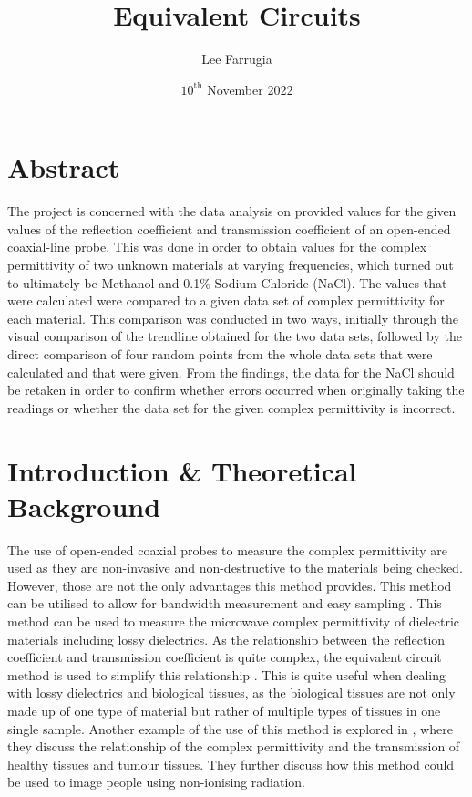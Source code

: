\documentclass[12pt, a4paper]{article}
\title{Equivalent Circuits}
\date{\(10^\mathrm{{th}}\) November 2022}
\author{Lee Farrugia}
\begin{document}
    
\maketitle
\thispagestyle{titlepagestyle}
\pagestyle{mystyle}

\section{Abstract}
The project is concerned with the data analysis on provided values for the given values of the reflection coefficient and transmission coefficient of an open-ended coaxial-line probe. This was done in order to obtain values for the complex permittivity of two unknown materials at varying frequencies, which turned out to ultimately be Methanol and 0.1\% Sodium Chloride (NaCl). The values that were calculated were compared to a given data set of complex permittivity for each material. This comparison was conducted in two ways, initially through the visual comparison of the trendline obtained for the two data sets, followed by the direct comparison of four random points from the whole data sets that were calculated and that were given. From the findings, the data for the NaCl should be retaken in order to confirm whether errors occurred when originally taking the readings or whether the data set for the given complex permittivity is incorrect.

\section{Introduction \& Theoretical Background}
The use of open-ended coaxial probes to measure the complex permittivity are used as they are non-invasive and non-destructive to the materials being checked. However, those are not the only advantages this method provides. This method can be utilised to allow for bandwidth measurement and easy sampling \parencite{liao2011accurate}. This method can be used to measure the microwave complex permittivity of dielectric materials including lossy dielectrics. As the relationship between the reflection coefficient and transmission coefficient is quite complex, the equivalent circuit method is used to simplify this relationship \parencite{stuchly1982equivalent}. This is quite useful when dealing with lossy dielectrics and biological tissues, as the biological tissues are not only made up of one type of material but rather of multiple types of tissues in one single sample. Another example of the use of this method is explored in \cite{zajivcek2006evaluation}, where they discuss the relationship of the complex permittivity and the transmission of healthy tissues and tumour tissues. They further discuss how this method could be used to image people using non-ionising radiation.
\end{document}
